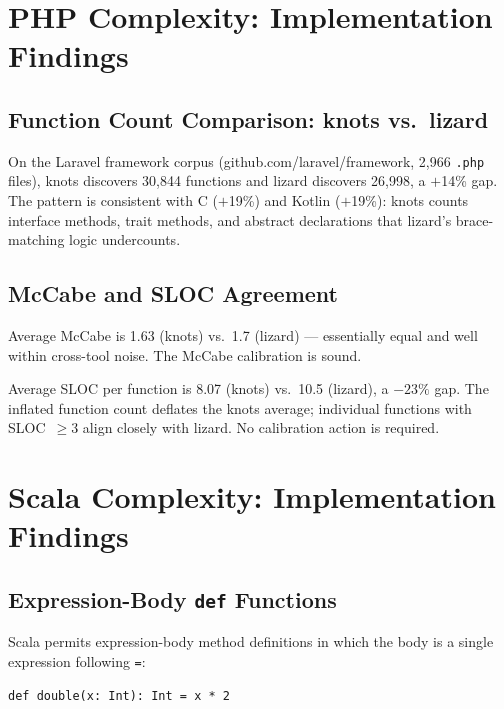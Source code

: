 \documentclass[10pt,twocolumn,letterpaper]{article}
\begin{document}
\section{PHP Complexity: Implementation Findings}
\label{sec:php-findings}

\subsection{Function Count Comparison: knots vs.\ lizard}

On the Laravel framework corpus (github.com/laravel/framework, 2{,}966
\texttt{.php} files), knots discovers 30{,}844 functions and lizard
discovers 26{,}998, a $+$14\% gap.  The pattern is consistent with
C ($+$19\%) and Kotlin ($+$19\%): knots counts interface methods, trait
methods, and abstract declarations that lizard's brace-matching logic
undercounts.

\subsection{McCabe and SLOC Agreement}

Average McCabe is 1.63 (knots) vs.\ 1.7 (lizard) --- essentially equal
and well within cross-tool noise.  The McCabe calibration is sound.

Average SLOC per function is 8.07 (knots) vs.\ 10.5 (lizard), a $-23\%$
gap.  The inflated function count deflates the knots average; individual
functions with SLOC~$\geq 3$ align closely with lizard.  No calibration
action is required.

\section{Scala Complexity: Implementation Findings}
\label{sec:scala-findings}

\subsection{Expression-Body \texttt{def} Functions}

Scala permits expression-body method definitions in which the body is
a single expression following \texttt{=}:

\begin{verbatim}
def double(x: Int): Int = x * 2
\end{verbatim}
\end{document}
